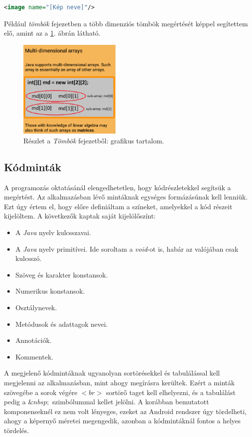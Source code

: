 \documentclass[12pt,a4paper]{article}
\begin{document}
	\bigskip
	\begin{lstlisting}[language=XML]
	<image name="[Kép neve]"/>
	\end{lstlisting}
	
	Például \textit{tömbök} fejezetben a több dimenziós tömbök megértését képpel segítettem elő, amint az a \ref{image_component_figure}. ábrán látható.
	
	\begin{figure}
		\centering
		\includegraphics[width=5cm]{image_component}
		\caption{Részlet a \textit{Tömbök} fejezetből: grafikus tartalom.}
		\label{image_component_figure}
	\end{figure}
	
	\subsection{Kódminták} \label{kodmintak}
	
	A programozás oktatásánál elengedhetetlen, hogy kódrészletekkel segítsük a megértést. Az alkalmazásban lévő mintáknak egységes formázásúnak kell lenniük. Ezt úgy értem el, hogy előre definiáltam a színeket, amelyekkel a kód részeit kijelöltem. A következők kaptak saját kijelölőszínt:
	
	\begin{itemize}
		\item A \textit{Java} nyelv kulcsszavai.
		\item A \textit{Java} nyelv primitívei. Ide soroltam a \textit{void}-ot is, habár az valójában csak kulcsszó.
		\item Szöveg és karakter konstansok.
		\item Numerikus konstansok.
		\item Osztálynevek.
		\item Metódusok és adattagok nevei.
		\item Annotációk.
		\item Kommentek. 
	\end{itemize}
	
	A megjelenő kódmintáknak ugyanolyan sortörésekkel és tabulálással kell megjelenni az alkalmazásban, mint ahogy megírásra kerültek. Ezért a minták szövegébe a sorok végére $<br>$ sortörő taget kell elhelyezni, és a tabulálást pedig a $\&nbsp;$ szimbólummal kellet jelölni. A korábban bemutatott komponenseknél ez nem volt lényeges, ezeket az Android rendszer úgy tördelheti, ahogy a képernyő méretei megengedik, azonban a kódmintáknál fontos a helyes tördelés.
	
\end{document}
